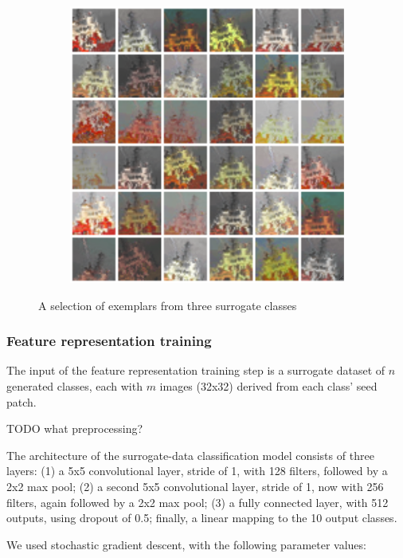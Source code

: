 \documentclass{article} %
\begin{document}
\begin{figure}[h]
\begin{subfigure}{0.25\textwidth}
\end{subfigure}
\begin{subfigure}{0.25\textwidth}
  \centering
  \includegraphics[width=\textwidth]{figs/patch_noflip_boattop.png}
\end{subfigure}
\caption{A selection of exemplars from three surrogate classes}
\label{figpatch}
\end{figure}

\subsubsection{Feature representation training}
The input of the feature representation training step is a surrogate dataset of $n$ generated classes, each with $m$ images (32x32) derived from each class' seed patch.

TODO what preprocessing?

The architecture of the surrogate-data classification model consists of three layers: (1) a 5x5 convolutional layer, stride of 1, with 128 filters, followed by a 2x2 max pool; (2) a second 5x5 convolutional layer, stride of 1, now with 256 filters, again followed by a 2x2 max pool; (3) a fully connected layer, with 512 outputs, using dropout of 0.5; finally, a linear mapping to the 10 output classes.

We used stochastic gradient descent, with the following parameter values:
\end{document}
